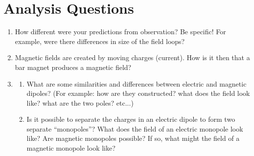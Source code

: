\documentclass[12pt]{article}
\begin{document}
	\section*{Analysis Questions}
	\begin{enumerate}
		\item{How different were your predictions from observation? Be specific! For example, were there differences in size of the field loops?}
		\item{Magnetic fields are created by moving charges (current). How is it then that a bar magnet produces a magnetic field?}
		\item 
		\begin{enumerate}
			\item What are some similarities and differences between electric and magnetic dipoles? (For example: how are they constructed? what does the field look like? what are the two poles? etc...) 
			\item Is it possible to separate the charges in an electric dipole to form two separate ``monopoles''? What does the field of an electric monopole look like? Are magnetic monopoles possible? If so, what might the field of a magnetic monopole look like?
		\end{enumerate}
	\end{enumerate}
	
\end{document}
